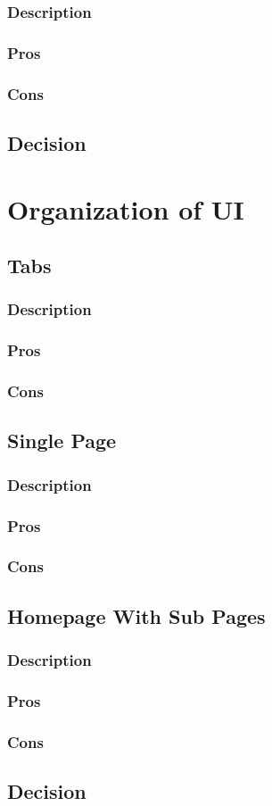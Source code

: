 \documentclass[onecolumn, draftclsnofoot,10pt, compsoc]{IEEEtran}
\begin{document}
\subsubsection*{Description}
\subsubsection*{Pros}
\subsubsection*{Cons}

\subsection{Decision}

\section{Organization of UI}

\subsection{Tabs}
\subsubsection*{Description}
\subsubsection*{Pros}
\subsubsection*{Cons}

\subsection{Single Page}
\subsubsection*{Description}
\subsubsection*{Pros}
\subsubsection*{Cons}

\subsection{Homepage With Sub Pages}
\subsubsection*{Description}
\subsubsection*{Pros}
\subsubsection*{Cons}

\subsection{Decision}
\end{document}
